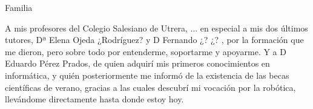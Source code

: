 Familia

A mis profesores del Colegio Salesiano de Utrera, ...
en especial a mis dos últimos tutores, Dª Elena Ojeda ¿Rodríguez? y D Fernando ¿? ¿? , por la formación que me dieron, pero sobre todo por entenderme, soportarme y apoyarme. Y a D Eduardo Pérez Prados, de quien adquirí mis primeros conocimientos en informática, y quién posteriormente me informó de la existencia de las becas científicas de verano, gracias a las cuales descubrí mi vocación por la robótica, llevándome directamente hasta donde estoy hoy.

{}%
\vspace{-.3cm}
{}%
{}%
